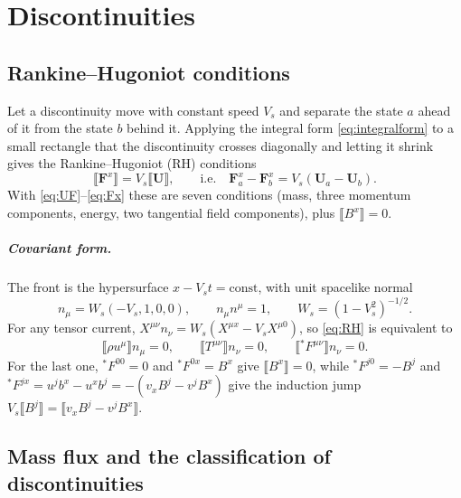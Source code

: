\documentclass[11pt,a4paper,oneside,openany]{book}
\newcommand{\parencite}{\citep}
\theoremstyle{definition}
\theoremstyle{plain}
\theoremstyle{remark}
\newcommand{\jump}[1]{\llbracket #1\rrbracket}
\newcommand{\UU}{\bm{U}}
\newcommand{\FF}{\bm{F}}
\begin{document}
\chapter{Discontinuities}\label{ch:discontinuities}

\section{Rankine--Hugoniot conditions}

Let a discontinuity move with constant speed $V_s$ and separate the state $a$ ahead of it
from the state $b$ behind it. Applying the integral form \eqref{eq:integralform} to a
small rectangle that the discontinuity crosses diagonally and letting it shrink gives the
Rankine--Hugoniot (RH) conditions
\begin{equation}\label{eq:RH}
\jump{\FF^x}=V_s\jump{\UU},\qquad\text{i.e.}\quad \FF^x_a-\FF^x_b=V_s(\UU_a-\UU_b).
\end{equation}
With \eqref{eq:UF}--\eqref{eq:Fx} these are seven conditions (mass, three momentum
components, energy, two tangential field components), plus $\jump{B^x}=0$.

\paragraph{Covariant form.} The front is the hypersurface $x-V_st=\text{const}$, with
unit spacelike normal
\begin{equation}
n_\mu=W_s(-V_s,1,0,0),\qquad n_\mu n^\mu=1,\qquad W_s=(1-V_s^2)^{-1/2}.
\end{equation}
For any tensor current, $X^{\mu\nu}n_\nu=W_s(X^{\mu x}-V_sX^{\mu0})$, so \eqref{eq:RH}
is equivalent to \parencite{Anile1989,GiacomazzoRezzolla2006}
\begin{equation}\label{eq:RHcov}
\jump{\rho u^\mu}n_\mu=0,\qquad \jump{T^{\mu\nu}}n_\nu=0,\qquad
\jump{{}^\ast\!F^{\mu\nu}}n_\nu=0 .
\end{equation}
For the last one, ${}^\ast\!F^{00}=0$ and ${}^\ast\!F^{0x}=B^x$ give $\jump{B^x}=0$,
while ${}^\ast\!F^{j0}=-B^j$ and ${}^\ast\!F^{jx}=u^jb^x-u^xb^j=-(v_xB^j-v^jB^x)$ give
the induction jump $V_s\jump{B^j}=\jump{v_xB^j-v^jB^x}$.

\section{Mass flux and the classification of discontinuities}
\end{document}
